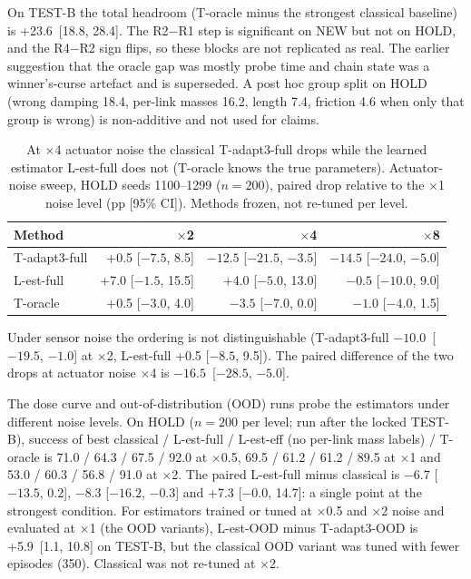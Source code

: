 On TEST-B the total headroom (T-oracle minus the strongest classical baseline) is +23.6\pp\ [18.8, 28.4]. The R2$-$R1 step is significant on NEW but not on HOLD, and the R4$-$R2 sign flips, so these blocks are not replicated as real. The earlier suggestion that the oracle gap was mostly probe time and chain state was a winner's-curse artefact and is superseded. A post hoc group split on HOLD (wrong damping 18.4\pp, per-link masses 16.2, length 7.4, friction 4.6 when only that group is wrong) is non-additive and not used for claims.

\begin{table}[htbp]
\centering
\caption{At $\times$4 actuator noise the classical T-adapt3-full drops while the learned estimator L-est-full does not (T-oracle knows the true parameters). Actuator-noise sweep, HOLD seeds 1100--1299 ($n{=}200$), paired drop relative to the $\times$1 noise level (pp [95\% CI]). Methods frozen, not re-tuned per level.}
\label{tab:fragility}
\begin{tabular}{@{}lrrr@{}}
\toprule
Method & $\times$2 & $\times$4 & $\times$8 \\ \midrule
T-adapt3-full & +0.5 [$-7.5$, 8.5] & $-12.5$ [$-21.5$, $-3.5$] & $-14.5$ [$-24.0$, $-5.0$] \\
L-est-full & +7.0 [$-1.5$, 15.5] & +4.0 [$-5.0$, 13.0] & $-0.5$ [$-10.0$, 9.0] \\
T-oracle & +0.5 [$-3.0$, 4.0] & $-3.5$ [$-7.0$, 0.0] & $-1.0$ [$-4.0$, 1.5] \\
\bottomrule
\end{tabular}
\end{table}

Under sensor noise the ordering is not distinguishable (T-adapt3-full $-10.0$\pp\ [$-19.5$, $-1.0$] at $\times$2, L-est-full +0.5 [$-8.5$, 9.5]). The paired difference of the two drops at actuator noise $\times$4 is $-16.5$\pp\ [$-28.5$, $-5.0$].

The dose curve and out-of-distribution (OOD) runs probe the estimators under different noise levels. On HOLD ($n{=}200$ per level; run after the locked TEST-B), success of best classical / L-est-full / L-est-eff (no per-link mass labels) / T-oracle is 71.0 / 64.3 / 67.5 / 92.0 at $\times$0.5, 69.5 / 61.2 / 61.2 / 89.5 at $\times$1 and 53.0 / 60.3 / 56.8 / 91.0 at $\times$2. The paired L-est-full minus classical is $-6.7$ [$-13.5$, 0.2], $-8.3$ [$-16.2$, $-0.3$] and +7.3 [$-0.0$, 14.7]: a single point at the strongest condition. For estimators trained or tuned at $\times$0.5 and $\times$2 noise and evaluated at $\times$1 (the OOD variants), L-est-OOD minus T-adapt3-OOD is +5.9\pp\ [1.1, 10.8] on TEST-B, but the classical OOD variant was tuned with fewer episodes (350). Classical was not re-tuned at $\times$2.

